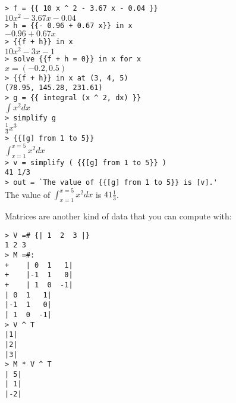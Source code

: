 \documentclass[12pt]{article}
\newenvironment{indpar}[1][0.3in]%
	{\begin{list}{}%
		     {\setlength{\itemsep}{0in}%
		      \setlength{\topsep}{0in}%
		      \setlength{\parsep}{1ex}%
		      \setlength{\labelwidth}{#1}%
		      \setlength{\leftmargin}{#1}%
		      \addtolength{\leftmargin}{\labelsep}}%
	 \item}%
	{\end{list}}
\begin{document}
\begin{indpar}
\verb/> f = {{ 10 x ^ 2 - 3.67 x - 0.04 }}/ \\
$10x^2-3.67x-0.04$ \\
\verb/> h = {{- 0.96 + 0.67 x}} in x/ \\
$-0.96+0.67x$ \\
\verb/> {{f + h}} in x/ \\
$10x^2-3x-1$ \\
\verb/> solve {{f + h = 0}} in x for x/ \\
$x = (-0.2, 0.5)$ \\
\verb/> {{f + h}} in x at (3, 4, 5)/ \\
\verb/(78.95, 145.28, 231.61)/ \\
\verb/> g = {{ integral (x ^ 2, dx) }}/ \\
$\int x^2 dx$ \\
\verb/> simplify g/ \\
$\frac{1}{3} x^3$ \\
\verb/> {{[g] from 1 to 5}}/ \\
$\int_{x = 1}^{x = 5} x^2 dx$ \\
\verb/> v = simplify ( {{[g] from 1 to 5}} )/ \\
\verb:41 1/3: \\
\verb/> out = `The value of {{[g] from 1 to 5}} is [v].'/ \\
The value of $\int_{x = 1}^{x = 5} x^2 dx$ is $41\frac{1}{3}$.
\end{indpar}

Matrices are another kind of data that you can compute
with:

\begin{indpar}
\verb/> V =# {| 1  2  3 |}/ \\
\verb/1 2 3/ \\
\verb/> M =#:/ \\
\verb/+    | 0  1   1|/ \\
\verb/+    |-1  1   0|/ \\
\verb/+    | 1  0  -1|/ \\
\verb/| 0  1   1|/ \\
\verb/|-1  1   0|/ \\
\verb/| 1  0  -1|/ \\
\verb/> V ^ T/ \\
\verb/|1|/ \\
\verb/|2|/ \\
\verb/|3|/ \\
\verb/> M * V ^ T/ \\
\verb/| 5|/ \\
\verb/| 1|/ \\
\verb/|-2|/
\end{indpar}
\end{document}

